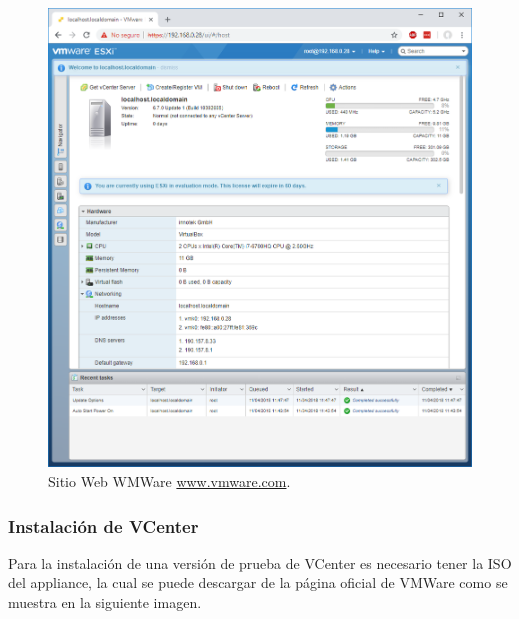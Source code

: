 \begin{figure}[!hbtp]
	\centering
	\includegraphics[width=\linewidth]{Trabajo/RecursosEducativos/RE01_VMwareESXi/RE_VMwareInstalacion16.png}
	\vspace{-0.2cm}
	\caption{Sitio Web WMWare \url{www.vmware.com}.\footnotemark[2]{} }
	\label{fig:VMwareInstalacion16}
\end{figure}

\subsubsection{Instalación de VCenter}

Para la instalación de una versión de prueba de VCenter es necesario tener la ISO del appliance, la cual se puede descargar de la página oficial de VMWare como se muestra en la siguiente imagen.



